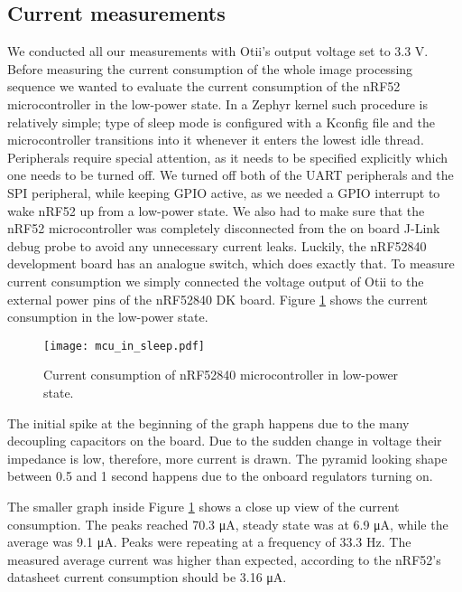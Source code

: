 \subsection{ Current measurements}

We conducted all our measurements with Otii's output voltage set to 3.3 V.
Before measuring the current consumption of the whole image processing sequence we wanted to evaluate the current consumption of the nRF52 microcontroller in the low-power state.
In a Zephyr kernel such procedure is relatively simple; type of sleep mode is configured with a Kconfig file and the microcontroller transitions into it whenever it enters the lowest idle thread.
Peripherals require special attention, as it needs to be specified explicitly which one needs to be turned off.
We turned off both of the UART peripherals and the SPI peripheral, while keeping GPIO active, as we needed a GPIO interrupt to wake nRF52 up from a low-power state.
We also had to make sure that the nRF52 microcontroller was completely disconnected from the on board J-Link debug probe to avoid any unnecessary current leaks.
Luckily, the nRF52840 development board has an analogue switch, which does exactly that.
To measure current consumption we simply connected the voltage output of Otii to the external power pins of the nRF52840 DK board.
Figure \ref{mcu_in_sleep} shows the current consumption in the low-power state.
\newline
\begin{figure}[ht]
    \centering
    \texttt{[image: mcu\_in\_sleep.pdf]}
    \caption{ Current consumption of nRF52840 microcontroller in low-power state.}
    \label{mcu_in_sleep}
\end{figure}

The initial spike at the beginning of the graph happens due to the many decoupling capacitors on the board.
Due to the sudden change in voltage their impedance is low, therefore, more current is drawn.
The pyramid looking shape between 0.5 and 1 second happens due to the onboard regulators turning on.

The smaller graph inside Figure \ref{mcu_in_sleep} shows a close up view of the current consumption.
The peaks reached 70.3 \si{\micro\ampere}, steady state was at 6.9 \si{\micro\ampere}, while the average was 9.1 \si{\micro\ampere}.
Peaks were repeating at a frequency of 33.3 \si{\hertz}.
\clearpage
The measured average current was higher than expected, according to the nRF52's datasheet\cite{nrf52_datasheet} current consumption should be 3.16 \si{\micro\ampere}.

